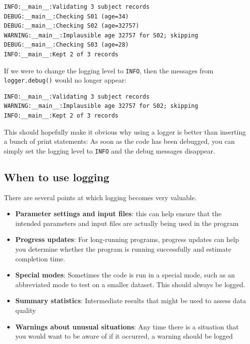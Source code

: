 \begin{lstlisting}[style=shell]
INFO:__main__:Validating 3 subject records
DEBUG:__main__:Checking S01 (age=34)
DEBUG:__main__:Checking S02 (age=32757)
WARNING:__main__:Implausible age 32757 for S02; skipping
DEBUG:__main__:Checking S03 (age=28)
INFO:__main__:Kept 2 of 3 records
\end{lstlisting}

If we were to change the logging level to \texttt{INFO}, then the messages from \texttt{logger.debug()} would no longer appear:

\begin{lstlisting}[style=shell]
INFO:__main__:Validating 3 subject records
WARNING:__main__:Implausible age 32757 for S02; skipping
INFO:__main__:Kept 2 of 3 records
\end{lstlisting}

This should hopefully make it obvious why using a logger is better than inserting a bunch of print statements:  As soon as the code has been debugged, you can simply set the logging level to \texttt{INFO} and the debug messages disappear.

\subsection{When to use logging}

There are several points at which logging becomes very valuable.

\begin{itemize}
\item \textbf{Parameter settings and input files}: this can help ensure that the intended parameters and input files are actually being used in the program
\item \textbf{Progress updates}: For long-running programs, progress updates can help you determine whether the program is running successfully and estimate completion time.
\item \textbf{Special modes}: Sometimes the code is run in a special mode, such as an abbreviated mode to test on a smaller dataset.  This should always be logged.
\item \textbf{Summary statistics}: Intermediate results that might be used to assess data quality
\item \textbf{Warnings about unusual situations}: Any time there is a situation that you would want to be aware of if it occurred, a warning should be logged
\end{itemize}

